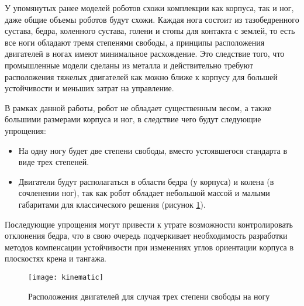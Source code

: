 У упомянутых ранее моделей роботов схожи комплекции как корпуса, так и ног, даже общие объемы роботов будут схожи. 
Каждая нога состоит из тазобедренного сустава, бедра, коленного сустава, голени и стопы для контакта с землей, то есть все ноги обладают тремя степенями свободы, а принципы расположения двигателей в ногах имеют минимальное расхождение. Это следствие того, что промышленные модели сделаны из металла и действительно требуют расположения тяжелых двигателей как можно ближе к корпусу для большей устойчивости и меньших затрат на управление. 

В рамках данной работы, робот не обладает существенным весом, а также большими размерами корпуса и ног, в следствие чего будут следующие упрощения:
\begin{itemize}
	\item На одну ногу будет две степени свободы, вместо устоявшегося стандарта в виде трех степеней.
	\item Двигатели будут располагаться в области бедра (у корпуса) и колена (в сочленении ног), так как робот обладает небольшой массой и малыми габаритами для классического решения (рисунок \ref{kinematic}).
\end{itemize}


Последующие упрощения могут привести к утрате возможности контролировать отклонения бедра, что в свою очередь подчеркивает необходимость разработки методов компенсации устойчивости при изменениях углов ориентации корпуса в плоскостях крена и тангажа.
\begin{figure}[h]
	\begin{center}
		\texttt{[image: kinematic]}
		\caption{Расположения двигателей для случая трех степени свободы на ногу}
		\label{kinematic}
	\end{center}
\end{figure}
